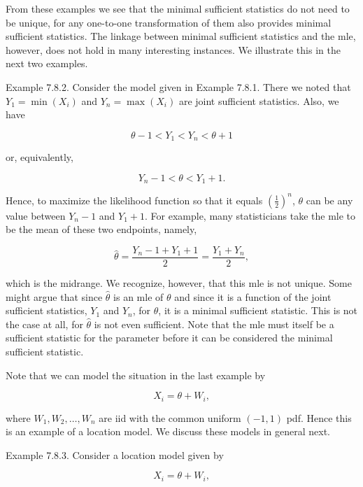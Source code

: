 From these examples we see that the minimal sufficient statistics do not need to be unique, for any one-to-one transformation of them also provides minimal sufficient statistics. The linkage between minimal sufficient statistics and the mle, however, does not hold in many interesting instances. We illustrate this in the next two examples.

Example 7.8.2. Consider the model given in Example 7.8.1. There we noted that $Y_{1}=\min \left(X_{i}\right)$ and $Y_{n}=\max \left(X_{i}\right)$ are joint sufficient statistics. Also, we have

$$
\theta-1<Y_{1}<Y_{n}<\theta+1
$$

or, equivalently,

$$
Y_{n}-1<\theta<Y_{1}+1 .
$$

Hence, to maximize the likelihood function so that it equals $\left(\frac{1}{2}\right)^{n}$, $\theta$ can be any value between $Y_{n}-1$ and $Y_{1}+1$. For example, many statisticians take the mle to be the mean of these two endpoints, namely,

$$
\hat{\theta}=\frac{Y_{n}-1+Y_{1}+1}{2}=\frac{Y_{1}+Y_{n}}{2},
$$

which is the midrange. We recognize, however, that this mle is not unique. Some might argue that since $\hat{\theta}$ is an mle of $\theta$ and since it is a function of the joint sufficient statistics, $Y_{1}$ and $Y_{n}$, for $\theta$, it is a minimal sufficient statistic. This is not the case at all, for $\hat{\theta}$ is not even sufficient. Note that the mle must itself be a sufficient statistic for the parameter before it can be considered the minimal sufficient statistic.

Note that we can model the situation in the last example by


\begin{equation*}
X_{i}=\theta+W_{i}, \tag{7.8.1}
\end{equation*}


where $W_{1}, W_{2}, \ldots, W_{n}$ are iid with the common uniform $(-1,1)$ pdf. Hence this is an example of a location model. We discuss these models in general next.

Example 7.8.3. Consider a location model given by


\begin{equation*}
X_{i}=\theta+W_{i}, \tag{7.8.2}
\end{equation*}


